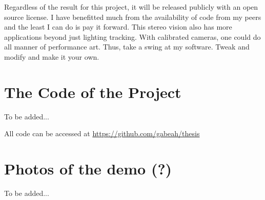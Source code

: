 \documentclass[
    12pt,
    twoside,
    bibstyle=chicago,
    headerstyle=uppercase,
	bibfile=biblatex_updating.bib
]{reedthesis}
\begin{document}
Regardless of the result for this project, it will be released publicly with an open source license. I have benefitted much from the availability of code from my peers and the least I can do is pay it forward. This stereo vision also has more applications beyond just lighting tracking. With calibrated cameras, one could do all manner of performance art. Thus, take a swing at my software. Tweak and modify and make it your own.

    \appendix
      \chapter{The Code of the Project}
      To be added...
      
All code can be accessed at \url{https://github.com/gabeah/thesis}      
      
      \chapter{Photos of the demo (?)}
      To be added...



  \backmatter %

    \nocite{*}


%  
 \printbibliography[heading=bibintoc]

\end{document}
